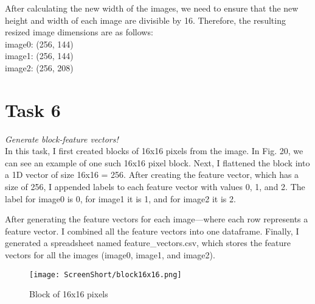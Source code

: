 \documentclass[conference,12pt]{IEEEtran}
\begin{document}
After calculating the new width of the images, we need to ensure that the new height and width of each image are divisible by 16. Therefore, the resulting resized image dimensions are as follows:\\
image0: (256, 144)\\
image1: (256, 144)\\
image2: (256, 208)\\

\section{Task 6}
\textit{Generate block-feature vectors!}\\
In this task, I first created blocks of 16x16 pixels from the image. In Fig. 20, we can see an example of one such 16x16 pixel block. Next, I flattened the block into a 1D vector of size 16x16 = 256. After creating the feature vector, which has a size of 256, I appended labels to each feature vector with values 0, 1, and 2. The label for image0 is 0, for image1 it is 1, and for image2 it is 2.

After generating the feature vectors for each image—where each row represents a feature vector. I combined all the feature vectors into one dataframe. Finally, I generated a spreadsheet named feature\_vectors.csv, which stores the feature vectors for all the images (image0, image1, and image2).
\begin{figure}[h!]
    \centering
    \texttt{[image: ScreenShort/block16x16.png]}
    \caption{Block of 16x16 pixels}
\end{figure}
\end{document}
